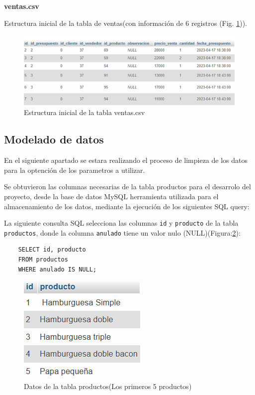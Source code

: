 \textbf{ventas.csv}

Estructura inicial de la tabla de ventas(con información de 6 registros (Fig. \ref{fig:ventas_original})).

\begin{figure}[H]
  \begin{center}
    \includegraphics[scale=0.90]{./ventas_tabla.png}
    \caption{Estructura inicial de la tabla  ventas.csv}
    \label{fig:ventas_original}
  \end{center}
\end{figure}

\subsection{Modelado de datos}
En el siguiente apartado se estara realizando el proceso de limpieza de los datos para la optención de los parametros a utilizar.

\vspace{1\baselineskip}

Se obtuvieron las columnas necesarias de la tabla productos para el desarrolo del proyecto, desde la base de datos MySQL herramienta utilizada para el almacenamiento de los datos, mediante la ejecución de los siguientes SQL query:

\vspace{4\baselineskip}
La siguiente consulta SQL selecciona las columnas \texttt{id} y \texttt{producto} de la tabla \texttt{productos}, donde la columna \texttt{anulado} tiene un valor nulo (NULL)(Figura:\ref{fig:priemeros_5productos}):
\begin{center}
  \begin{verbatim}
    SELECT id, producto
    FROM productos
    WHERE anulado IS NULL;
  \end{verbatim}
\end{center}
\begin{figure}[H]
  \begin{center}
    \includegraphics[scale=0.90]{./primeros_5productos.png}
    \caption{Datos de la tabla productos(Los primeros 5 productos)}
    \label{fig:priemeros_5productos}
  \end{center}
\end{figure}


